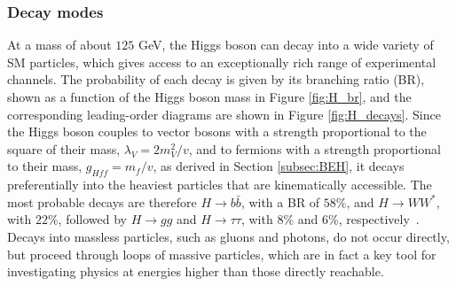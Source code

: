 




\subsubsection{Decay modes}
%
At a mass of about $125$ GeV, the Higgs boson can decay into a wide variety of SM particles, which gives access to an exceptionally rich range of experimental channels. The probability of each decay is given by its branching ratio (BR), shown as a function of the Higgs boson mass in Figure \ref{fig:H_br}, and the corresponding leading-order diagrams are shown in Figure \ref{fig:H_decays}. Since the Higgs boson couples to vector bosons with a strength proportional to the square of their mass, $\lambda_V = 2m_V^2/v$, and to fermions with a strength proportional to their mass, $g_{Hff} = m_f/v$, as derived in Section \ref{subsec:BEH}, it decays preferentially into the heaviest particles that are kinematically accessible. The most probable decays are therefore $H\to b\bar{b}$, with a BR of $58\%$, and $H\to WW^*$, with $22\%$, followed by $H\to gg$ and $H\to\tau\tau$, with $8\%$ and $6\%$, respectively~\cite{deFlorian:2016spz}. Decays into massless particles, such as gluons and photons, do not occur directly, but proceed through loops of massive particles, which are in fact a key tool for investigating physics at energies higher than those directly reachable.
%

